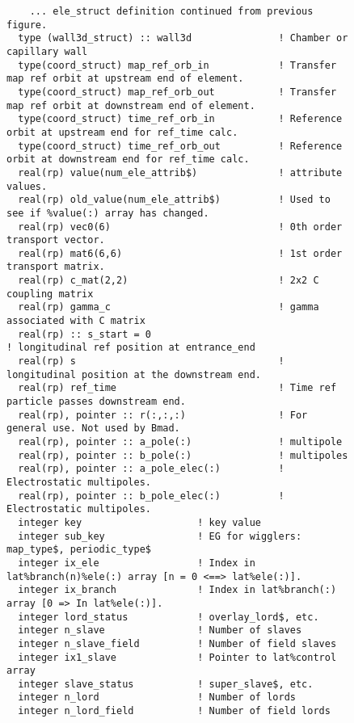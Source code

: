 
\begin{figure}[tb]
\centering
\footnotesize
\begin{verbatim}
    ... ele_struct definition continued from previous figure.
  type (wall3d_struct) :: wall3d               ! Chamber or capillary wall
  type(coord_struct) map_ref_orb_in            ! Transfer map ref orbit at upstream end of element.
  type(coord_struct) map_ref_orb_out           ! Transfer map ref orbit at downstream end of element.
  type(coord_struct) time_ref_orb_in           ! Reference orbit at upstream end for ref_time calc.
  type(coord_struct) time_ref_orb_out          ! Reference orbit at downstream end for ref_time calc.
  real(rp) value(num_ele_attrib$)              ! attribute values.
  real(rp) old_value(num_ele_attrib$)          ! Used to see if %value(:) array has changed.
  real(rp) vec0(6)                             ! 0th order transport vector.
  real(rp) mat6(6,6)                           ! 1st order transport matrix.
  real(rp) c_mat(2,2)                          ! 2x2 C coupling matrix
  real(rp) gamma_c                             ! gamma associated with C matrix
  real(rp) :: s_start = 0                                      ! longitudinal ref position at entrance_end
  real(rp) s                                   ! longitudinal position at the downstream end.
  real(rp) ref_time                            ! Time ref particle passes downstream end.
  real(rp), pointer :: r(:,:,:)                ! For general use. Not used by Bmad.
  real(rp), pointer :: a_pole(:)               ! multipole
  real(rp), pointer :: b_pole(:)               ! multipoles
  real(rp), pointer :: a_pole_elec(:)          ! Electrostatic multipoles.
  real(rp), pointer :: b_pole_elec(:)          ! Electrostatic multipoles.
  integer key                    ! key value
  integer sub_key                ! EG for wigglers: map_type$, periodic_type$
  integer ix_ele                 ! Index in lat%branch(n)%ele(:) array [n = 0 <==> lat%ele(:)].
  integer ix_branch              ! Index in lat%branch(:) array [0 => In lat%ele(:)].
  integer lord_status            ! overlay_lord$, etc.
  integer n_slave                ! Number of slaves
  integer n_slave_field          ! Number of field slaves
  integer ix1_slave              ! Pointer to lat%control array
  integer slave_status           ! super_slave$, etc.
  integer n_lord                 ! Number of lords
  integer n_lord_field           ! Number of field lords

\end{verbatim}
\end{figure}
